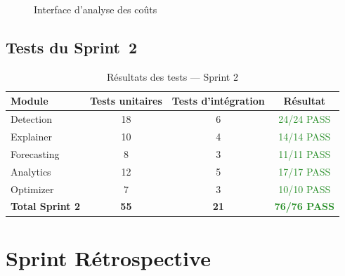 \begin{figure}[H]
    \centering
    \caption{Interface d'analyse des coûts}
    \label{fig:costs_ui}
\end{figure}


\subsection{Tests du Sprint~2}

\begin{table}[H]
\centering
\caption{Résultats des tests --- Sprint 2}
\label{tab:tests_s2}
\begin{tabular}{|l|c|c|c|}
\hline
\textbf{Module} & \textbf{Tests unitaires} & \textbf{Tests d'intégration} & \textbf{Résultat} \\
\hline
Detection & 18 & 6 & \textcolor{ForestGreen}{24/24 PASS} \\
\hline
Explainer & 10 & 4 & \textcolor{ForestGreen}{14/14 PASS} \\
\hline
Forecasting & 8 & 3 & \textcolor{ForestGreen}{11/11 PASS} \\
\hline
Analytics & 12 & 5 & \textcolor{ForestGreen}{17/17 PASS} \\
\hline
Optimizer & 7 & 3 & \textcolor{ForestGreen}{10/10 PASS} \\
\hline
\textbf{Total Sprint 2} & \textbf{55} & \textbf{21} & \textcolor{ForestGreen}{\textbf{76/76 PASS}} \\
\hline
\end{tabular}
\end{table}


\section{Sprint Rétrospective}
\label{sec:s2_retro}

